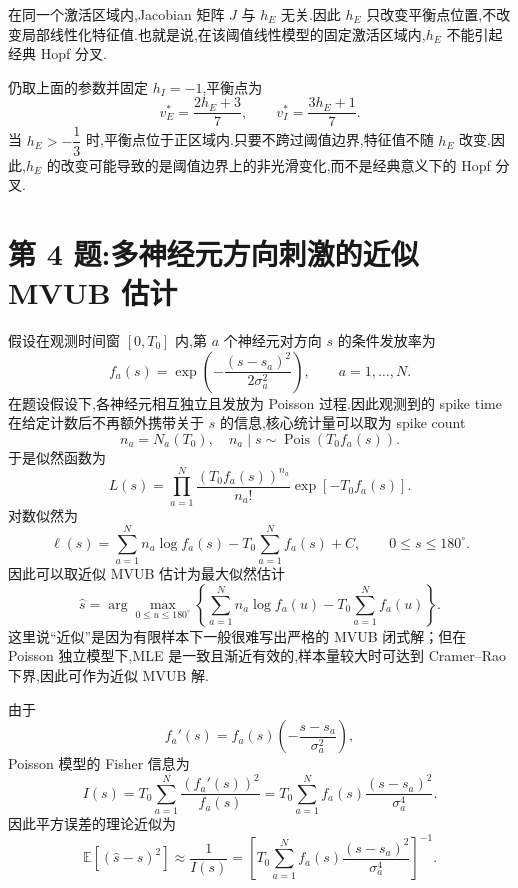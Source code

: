 \documentclass[oneside]{ctexart}
\DeclareMathOperator{\Pois}{Pois}
\begin{document}
在同一个激活区域内,Jacobian 矩阵 $J$ 与 $h_E$ 无关.因此 $h_E$ 只改变平衡点位置,不改变局部线性化特征值.也就是说,在该阈值线性模型的固定激活区域内,$h_E$ 不能引起经典 Hopf 分叉.

仍取上面的参数并固定 $h_I=-1$,平衡点为
\begin{equation}
    v_E^*=\dfrac{2h_E+3}{7},
    \qquad
    v_I^*=\dfrac{3h_E+1}{7}.
\end{equation}
当 $h_E>-\dfrac13$ 时,平衡点位于正区域内.只要不跨过阈值边界,特征值不随 $h_E$ 改变.因此,$h_E$ 的改变可能导致的是阈值边界上的非光滑变化,而不是经典意义下的 Hopf 分叉.

\section{第 4 题:多神经元方向刺激的近似 MVUB 估计}

假设在观测时间窗 $[0,T_0]$ 内,第 $a$ 个神经元对方向 $s$ 的条件发放率为
\begin{equation}
    f_a(s)=\exp\left(-\dfrac{(s-s_a)^2}{2\sigma_a^2}\right),
    \qquad a=1,\ldots,N.
\end{equation}
在题设假设下,各神经元相互独立且发放为 Poisson 过程.因此观测到的 spike time 在给定计数后不再额外携带关于 $s$ 的信息,核心统计量可以取为 spike count
\[
    n_a=N_a(T_0),
    \quad
    n_a\mid s\sim \Pois(T_0f_a(s)).
\]
于是似然函数为
\begin{equation}
    L(s)=\prod_{a=1}^N
    \dfrac{(T_0f_a(s))^{n_a}}{n_a!}
    \exp[-T_0f_a(s)].
\end{equation}
对数似然为
\begin{equation}
    \ell(s)=\sum_{a=1}^N n_a\log f_a(s)-T_0\sum_{a=1}^N f_a(s)+C,
    \qquad 0\leq s\leq 180^\circ.
\end{equation}
因此可以取近似 MVUB 估计为最大似然估计
\begin{equation}
    \boxed{
    \hat s=\arg\max_{0\leq u\leq 180^\circ}
    \left\{
    \sum_{a=1}^N n_a\log f_a(u)-T_0\sum_{a=1}^N f_a(u)
    \right\}
    }.
\end{equation}
这里说“近似”是因为有限样本下一般很难写出严格的 MVUB 闭式解；但在 Poisson 独立模型下,MLE 是一致且渐近有效的,样本量较大时可达到 Cramer--Rao 下界,因此可作为近似 MVUB 解.

由于
\begin{equation}
    f_a'(s)=f_a(s)\left(-\dfrac{s-s_a}{\sigma_a^2}\right),
\end{equation}
Poisson 模型的 Fisher 信息为
\begin{equation}
    I(s)=T_0\sum_{a=1}^N\dfrac{(f_a'(s))^2}{f_a(s)}
    =T_0\sum_{a=1}^N
    f_a(s)\dfrac{(s-s_a)^2}{\sigma_a^4}.
\end{equation}
因此平方误差的理论近似为
\begin{equation}
    \boxed{
    \mathbb E[(\hat s-s)^2]\approx \dfrac{1}{I(s)}
    =\left[T_0\sum_{a=1}^N
    f_a(s)\dfrac{(s-s_a)^2}{\sigma_a^4}\right]^{-1}
    }.
\end{equation}
\end{document}

